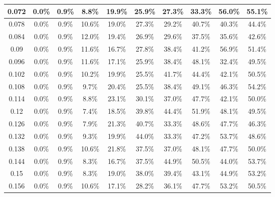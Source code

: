 \begin{table}[H]
\begin{tabular}{|c|c|c|c|c|c|c|c|c|c|}
\hline
0.072 &\cellcolor{green!25}0.0\% &\cellcolor{green!25}0.9\% & 8.8\% & 19.9\% & 25.9\% & 27.3\% & 33.3\% & 56.0\% & 55.1\% \\
\hline
0.078 &\cellcolor{green!25}0.0\% &\cellcolor{green!25}0.9\% & 10.6\% & 19.0\% & 27.3\% & 29.2\% & 40.7\% & 40.3\% & 44.4\% \\
\hline
0.084 &\cellcolor{green!25}0.0\% &\cellcolor{green!25}0.9\% & 12.0\% & 19.4\% & 26.9\% & 29.6\% & 37.5\% & 35.6\% & 42.6\% \\
\hline
0.09 &\cellcolor{green!25}0.0\% &\cellcolor{green!25}0.9\% & 11.6\% & \cellcolor{green!25}16.7\% & 27.8\% & 38.4\% & 41.2\% & 56.9\% & 51.4\% \\
\hline
0.096 &\cellcolor{green!25}0.0\% &\cellcolor{green!25}0.9\% & 11.6\% & 17.1\% & 25.9\% & 38.4\% & 48.1\% & 32.4\% & 49.5\% \\
\hline
0.102 &\cellcolor{green!25}0.0\% &\cellcolor{green!25}0.9\% & 10.2\% & 19.9\% & 25.5\% & 41.7\% & 44.4\% & 42.1\% & 50.5\% \\
\hline
0.108 &\cellcolor{green!25}0.0\% &\cellcolor{green!25}0.9\% & 9.7\% & 20.4\% & 25.5\% & 38.4\% & 49.1\% & 46.3\% & 54.2\% \\
\hline
0.114 &\cellcolor{green!25}0.0\% &\cellcolor{green!25}0.9\% & 8.8\% & 23.1\% & 30.1\% & 37.0\% & 47.7\% & 42.1\% & 50.0\% \\
\hline
0.12 &\cellcolor{green!25}0.0\% &\cellcolor{green!25}0.9\% & \cellcolor{green!25}7.4\% & 18.5\% & 39.8\% & 44.4\% & 51.9\% & 48.1\% & 49.5\% \\
\hline
0.126 &\cellcolor{green!25}0.0\% &\cellcolor{green!25}0.9\% & 7.9\% & 21.3\% & 40.7\% & 33.3\% & 48.6\% & 47.7\% & 46.3\% \\
\hline
0.132 &\cellcolor{green!25}0.0\% &\cellcolor{green!25}0.9\% & 9.3\% & 19.9\% & 44.0\% & 33.3\% & 47.2\% & 53.7\% & 48.6\% \\
\hline
0.138 &\cellcolor{green!25}0.0\% &\cellcolor{green!25}0.9\% & 10.6\% & 21.8\% & 37.5\% & 37.0\% & 48.1\% & 47.7\% & 50.0\% \\
\hline
0.144 &\cellcolor{green!25}0.0\% &\cellcolor{green!25}0.9\% & 8.3\% & \cellcolor{green!25}16.7\% & 37.5\% & 44.9\% & 50.5\% & 44.0\% & 53.7\% \\
\hline
0.15 &\cellcolor{green!25}0.0\% &\cellcolor{green!25}0.9\% & 8.3\% & 19.0\% & 38.0\% & 39.4\% & 43.1\% & 44.9\% & 53.2\% \\
\hline
0.156 &\cellcolor{green!25}0.0\% &\cellcolor{green!25}0.9\% & 10.6\% & 17.1\% & 28.2\% & 36.1\% & 47.7\% & 53.2\% & 50.5\% \\

\end{tabular}
\end{table}
